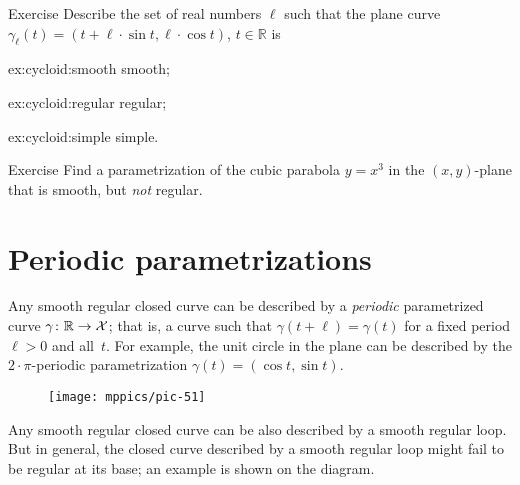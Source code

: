 \begin{thm}{Exercise}\label{ex:cycloid}
Describe the set of real numbers $\ell$
such that the plane curve $\gamma_\ell (t)= (t+\ell \cdot \sin t,\ell \cdot \cos t)$, $t\in\mathbb{R}$ is

\begin{minipage}{.30\textwidth}
\begin{subthm}{ex:cycloid:smooth}
smooth; 
\end{subthm}
\end{minipage}
\hfill
\begin{minipage}{.30\textwidth}
\begin{subthm}{ex:cycloid:regular}
regular;
\end{subthm}
\end{minipage}
\hfill
\begin{minipage}{.30\textwidth}
\begin{subthm}{ex:cycloid:simple}
simple.
\end{subthm}
\end{minipage}

\end{thm}

\begin{thm}{Exercise}\label{ex:nonregular}
Find a parametrization of the cubic parabola $y=x^3$ in the $(x,y)$-plane that is smooth, but \textit{not} regular.
\end{thm}


\section{Periodic parametrizations}

Any smooth regular closed curve can be described by a {}\emph{periodic} parametrized curve $\gamma\colon \mathbb{R}\to \mathcal{X}$;
that is, a curve such that $\gamma(t+\ell)=\gamma(t)$ for a fixed period $\ell>0$ and all~$t$.
For example, the unit circle in the plane can be described by the $2{\cdot}\pi$-periodic parametrization $\gamma(t)=(\cos t,\sin t)$.

{

\begin{wrapfigure}{o}{17 mm}
\vskip-2mm
\centering
\texttt{[image: mppics/pic-51]}
\end{wrapfigure}

Any smooth regular closed curve can be also described by a smooth regular loop.
But in general, the closed curve described by a smooth regular loop might fail to be regular at its base; an example is shown on the diagram.

}


